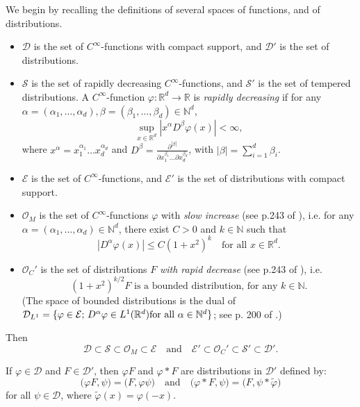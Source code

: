 \documentclass[12pt]{article}
\def\cD{\mathcal{D}}
\def\cE{\mathcal{E}}
\def\cO{\mathcal{O}}
\def\cS{\mathcal{S}}
\def\bN{\mathbb{N}}
\def\bR{\mathbb{R}}
\begin{document}
We begin by recalling the definitions of several spaces of functions, and of distributions.  
\begin{itemize}
\item $\cD$ is the set of $C^{\infty}$-functions with compact support, and $\cD'$ is the set of distributions.

\item $\cS$ is the set of  rapidly decreasing $C^{\infty}$-functions, and $\cS'$ is the set of tempered distributions. A $C^{\infty}$-function $\varphi:\bR^d \to \bR$ is
{\em rapidly decreasing} if for any $\alpha=(\alpha_1,\ldots,\alpha_d),\beta=(\beta_1,\ldots,\beta_d) \in \bN^d$, 
\[
\sup_{x\in \bR^d}|x^{\alpha}D^{\beta} \varphi(x)|<\infty,
\]
where $x^{\alpha}=x_1^{\alpha_1}\ldots x_d^{\alpha_d}$ and $D^{\beta}=\frac{\partial^{|\beta|}}{\partial x_1^{\beta_1}\ldots \partial x_d^{\beta_d}}$, with $|\beta|=\sum_{i=1}^d \beta_i$.  


\item $\cE$ is the set of $C^{\infty}$-functions, and $\cE'$ is the set of distributions with compact support.


\item $\cO_M$ is the set of $C^{\infty}$-functions $\varphi$ with {\em slow increase} (see p.243 of \cite{schwartz66}), i.e. for any $\alpha=(\alpha_1,\ldots,\alpha_d) \in \bN^d$, there exist $C>0$ and $k \in \bN$ such that
\[
|D^{\alpha} \varphi(x)| \leq C (1+x^2)^k \quad \mbox{for all $x \in \bR^d$}.
\]


\item $\cO_C'$ is the set of distributions $F$ {\em with rapid decrease} (see p.243 of \cite{schwartz66}), i.e.
     \[
     \mbox{$(1+x^2)^{k/2}F$ is a bounded distribution, for any $k \in \bN$.}
      \]
      (The space of bounded distributions is the dual of $\cD_{L^1}=\{\varphi \in \cE; \, D^{\alpha} \varphi \in L^1(\bR^d) \linebreak \mbox{for all $\alpha \in \bN^d$} \}$; see p. 200 of \cite{schwartz66}.)

\end{itemize}

Then
\[
\cD \subset \cS \subset \cO_M \subset \cE \quad \mbox{and} \quad \cE' \subset \cO_C' \subset \cS' \subset \cD'.
\]


If $\varphi \in \cD$ and $F \in \cD'$, then $\varphi F$ and $\varphi * F$ are distributions in $\cD'$ defined by:
\[
\big( \varphi F,\psi\big)=\big(F,\varphi \psi \big) \quad \mbox{and} \quad \big(\varphi *F, \psi\big) =\big(F,\psi * \widetilde{\varphi}\big) 
\]
for all $\psi \in \cD$, 
where $\widetilde{\varphi}(x)=\varphi(-x)$.
\end{document}
